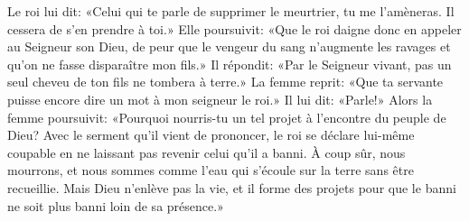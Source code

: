 Le roi lui dit: «Celui qui te parle de supprimer le meurtrier, tu me l’amèneras.
	Il cessera de s’en prendre à toi.»
Elle poursuivit: «Que le roi daigne donc en appeler au Seigneur son Dieu,
	de peur que le vengeur du sang n’augmente les ravages
		et qu’on ne fasse disparaître mon fils.»
Il répondit:
	«Par le Seigneur vivant, pas un seul cheveu de ton fils ne tombera à terre.»
La femme reprit:
	«Que ta servante puisse encore dire un mot à mon seigneur le roi.»
Il lui dit: «Parle!»
Alors la femme poursuivit:
	«Pourquoi nourris-tu un tel projet à l’encontre du peuple de Dieu?
Avec le serment qu’il vient de prononcer, le roi se déclare lui-même coupable
	en ne laissant pas revenir celui qu’il a banni.
À coup sûr, nous mourrons,
	et nous sommes comme l’eau qui s’écoule sur la terre sans être recueillie.
Mais Dieu n’enlève pas la vie,
	et il forme des projets pour que le banni ne soit plus banni loin de sa présence.»
